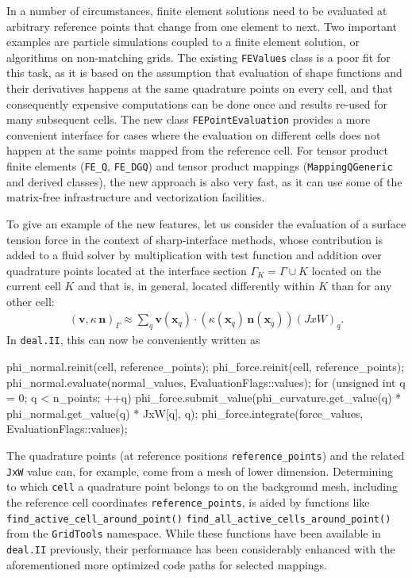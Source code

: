 \documentclass{ansarticle-preprint}
\newcommand{\specialword}[1]{\texttt{#1}}
\newcommand{\dealii}{{\specialword{deal.II}}\xspace}
\begin{document}
In a number of circumstances, finite element solutions need to be evaluated at
arbitrary reference points that change from one element to next. Two important
examples are particle simulations coupled to a finite element solution, or
algorithms on non-matching grids. The existing \texttt{FEValues} class is a poor
fit for this task, as it is based on the assumption that evaluation of
shape functions and their derivatives happens at the same quadrature
points on every cell, and that consequently expensive computations can
be done once and results re-used for many subsequent cells. The new class
\texttt{FEPointEvaluation} provides a more convenient interface for
cases where the evaluation on different cells does not happen at the
same points mapped from the reference cell.
For tensor product finite elements (\texttt{FE\_Q}, \texttt{FE\_DGQ})
and tensor product mappings (\texttt{MappingQGeneric} and derived classes),
the new approach is also very fast, as it can use some of the matrix-free
infrastructure and vectorization facilities.

To give an example of the new features, let us consider the evaluation of a
surface tension force in the context of sharp-interface methods, whose
contribution is added to a fluid solver by multiplication with test function
and addition over quadrature points located at the interface section
$\Gamma_K=\Gamma \cup K$ located on the current cell $K$ and that is,
in general, located differently within $K$ than for any other cell:
\begin{align*}
\left(\mathbf{v}, \kappa \, \mathbf{n}\right)_\Gamma
\approx
\sum_q \mathbf{v}(\mathbf{x}_q) \cdot \left(\kappa(\mathbf{x}_q) \, \mathbf{n}(\mathbf{x}_q)\right) (JxW)_q.
\end{align*}
In \dealii{}, this can now be conveniently written as
\begin{c++}
phi_normal.reinit(cell, reference_points);
phi_force.reinit(cell, reference_points);
phi_normal.evaluate(normal_values, EvaluationFlags::values);
for (unsigned int q = 0; q < n_points; ++q)
   phi_force.submit_value(phi_curvature.get_value(q) *
                          phi_normal.get_value(q) * JxW[q], q);
phi_force.integrate(force_values, EvaluationFlags::values);
\end{c++}
The quadrature points (at reference positions
\texttt{reference\_points}) and the related \texttt{JxW} value can,
for example, come from
a mesh of lower dimension. Determining to which \texttt{cell} a quadrature
point belongs to on the background mesh, including the reference cell
coordinates \texttt{reference\_\allowbreak points}, is aided by functions like
\texttt{find\_active\_cell\_around\_point()}
\texttt{find\_all\_active\_cells\_\allowbreak around\_\allowbreak point()} from the \texttt{GridTools} namespace. While these
functions have been available in \dealii{} previously, their performance has
been considerably enhanced with the aforementioned more optimized code paths
for selected mappings.
\end{document}
